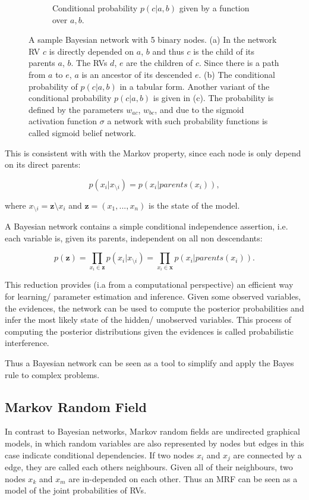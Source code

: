 \begin{figure}[h]
\begin{subfigure}[t]{.33\textwidth}
  		\caption{Conditional probability $p(c |a , b)$ given by a function over $a,b$.}
  		\label{fig:bayesnet}
	\end{subfigure}
	\caption{A sample Bayesian network with 5 binary nodes. (a) In the network RV $c$ is directly depended on $a$, $b$ and thus $c$ is the child of its parents $a$, $b$. The RVs $d$, $e$ are the children of $c$. Since there is a path from $a$ to $e$, $a$ is an ancestor of its descended $e$. (b) The conditional probability of $p(c |a , b)$ in a tabular form. Another variant of the conditional probability $p(c |a , b)$ is given in (c). The probability is defined by the parameters $w_{ac}$, $w_{bc}$, and due to the sigmoid activation function $\sigma$ a network with such probability functions is called sigmoid belief network.}
	\label{fig:test}
\end{figure}

This is consistent with with the Markov property, since each node is only depend on its direct parents:

\[
p(x_i | x_{\setminus i}) = p(x_i | parents(x_i) ),
\]

where $x_{\setminus i} = \textbf{z} \setminus x_i$ and $\textbf{z} = (x_1, ... , x_n)$ is the state of the model.


A Bayesian network contains a simple conditional independence assertion, i.e. each variable is, given its parents, independent on all non descendants:

\[
p(\textbf{z}) = \prod_{x_i \in \textbf{z}} p(x_i | x_{\setminus i}) = \prod_{x_i \in \textbf{x}} p(x_i | parents(x_i) ) .
\]

This reduction provides (i.a from a computational perspective) an efficient way for learning/ parameter estimation and inference.
Given some observed variables, the evidences, the network can be used to compute the posterior probabilities and infer the most likely state of the hidden/ unobserved variables.
This process of computing the posterior distributions given the evidences is called probabilistic interference.

Thus a Bayesian network can be seen as a tool to simplify and apply the Bayes rule to complex problems.   

\subsection{Markov Random Field}

In contrast to Bayesian networks, Markov random fields are undirected graphical models, in which random variables are also represented by nodes but edges in this case indicate conditional dependencies.
If two nodes $x_i$ and $x_j$ are connected by a edge, they are called each others neighbours.
Given all of their neighbours, two nodes $x_k$ and $x_m$ are in-depended on each other.
Thus an MRF can be seen as a model of the joint probabilities of RVs.

